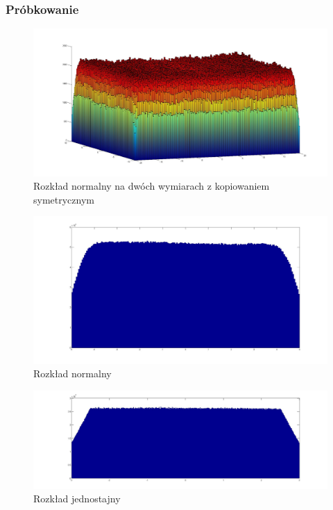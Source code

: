 \documentclass{mini}
\begin{document}
\subsubsection*{Próbkowanie}

\begin{figure}[H]
\centering
\includegraphics[width=\textwidth]{s_n_10M_2__20_20__10_10_4_2}
\caption{Rozkład normalny na dwóch wymiarach z kopiowaniem symetrycznym}
\end{figure}

\begin{figure}[H]
\centering
\includegraphics[width=\textwidth]{s_n_10M_1__5_5}
\caption{Rozkład normalny}
\end{figure}

\begin{figure}[H]
\centering
\includegraphics[width=\textwidth]{s_j_20M_1__3_3}
\caption{Rozkład jednostajny}
\end{figure}
\end{document}
